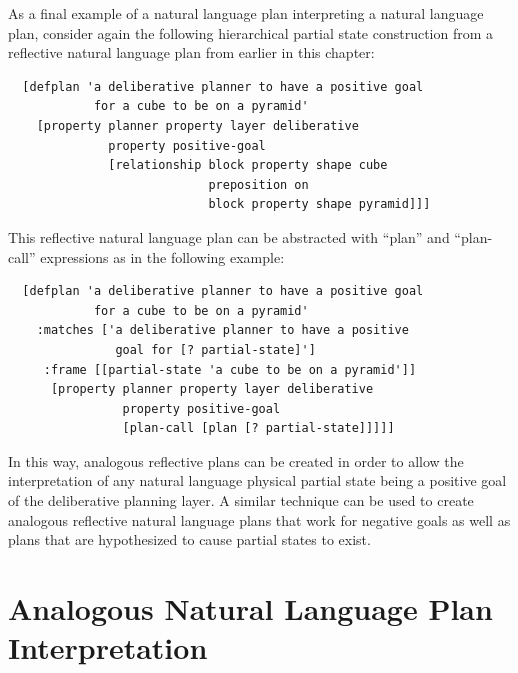 As a final example of a natural language plan interpreting a natural
language plan, consider again the following hierarchical partial state
construction from a reflective natural language plan from earlier in
this chapter:
\begin{samepage}
\begin{Verbatim}
  [defplan 'a deliberative planner to have a positive goal
            for a cube to be on a pyramid'
    [property planner property layer deliberative
              property positive-goal
              [relationship block property shape cube
                            preposition on
                            block property shape pyramid]]]
\end{Verbatim}
\end{samepage}
This reflective natural language plan can be abstracted with ``plan''
and ``plan-call'' expressions as in the following example:
\begin{samepage}
\begin{Verbatim}
  [defplan 'a deliberative planner to have a positive goal
            for a cube to be on a pyramid'
    :matches ['a deliberative planner to have a positive
               goal for [? partial-state]']
     :frame [[partial-state 'a cube to be on a pyramid']]
      [property planner property layer deliberative
                property positive-goal
                [plan-call [plan [? partial-state]]]]]
\end{Verbatim}
\end{samepage}
In this way, analogous reflective plans can be created in order to
allow the interpretation of any natural language physical partial
state being a positive goal of the deliberative planning layer.  A
similar technique can be used to create analogous reflective natural
language plans that work for negative goals as well as plans that are
hypothesized to cause partial states to exist.

\section{Analogous Natural Language Plan Interpretation}

